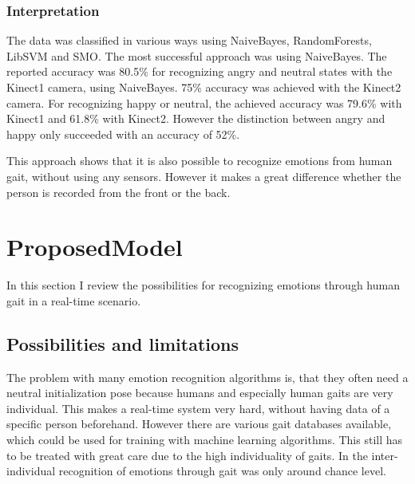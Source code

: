 \documentclass[conference]{IEEEtran}
\begin{document}
\subsubsection{Interpretation}
The data was classified in various ways using NaiveBayes, RandomForests, LibSVM and SMO\cite{li2016emotion}. The most successful approach was using NaiveBayes.  
The reported accuracy was 80.5\% for recognizing angry and neutral states with the Kinect1 camera, using NaiveBayes. 75\% accuracy was achieved with the Kinect2 camera.
For recognizing happy or neutral, the achieved accuracy was 79.6\% with Kinect1 and 61.8\% with Kinect2. However the distinction between angry and happy only succeeded with an accuracy of 52\%\cite{li2016emotion}.

This approach shows that it is also possible to recognize emotions from human gait, without using any sensors. However it makes a great difference whether the person is recorded from the front or the back.


\section{ProposedModel}
In this section I review the possibilities for recognizing emotions through human gait in a real-time scenario.

\subsection{Possibilities and limitations}
The problem with many emotion recognition algorithms is, that they often need a neutral initialization pose\cite{li2016emotion,cui2016emotion} because humans and especially human gaits are very individual. This makes a real-time system very hard, without having data of a specific person beforehand. However there are various gait databases available\cite{wang2008recognizing,karg2009comparison}, which could be used for training with machine learning algorithms. This still has to be treated with great care due to the high individuality of gaits\cite{karg2012pattern,janssen2008recognition}. In \cite{janssen2008recognition} the inter-individual recognition of emotions through gait was only around chance level.
\end{document}
